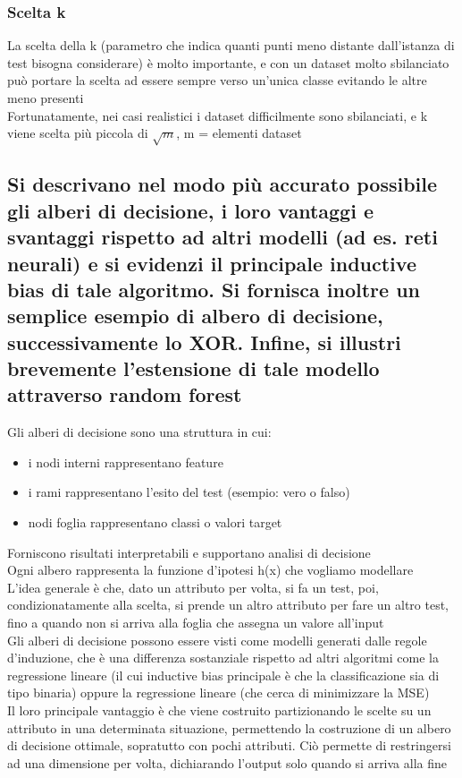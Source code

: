 \documentclass[10pt,oneside,a4paper]{article}
\begin{document}
	\subsubsection{Scelta k}
	La scelta della k (parametro che indica quanti punti meno distante dall'istanza di test bisogna considerare) è molto importante, e con un dataset molto sbilanciato può portare la scelta ad essere sempre verso un'unica classe evitando le altre meno presenti\\
	Fortunatamente, nei casi realistici i dataset difficilmente sono sbilanciati, e k viene scelta più piccola di $\sqrt{m}$, m = elementi dataset
	
	\subsection{Si descrivano nel modo più accurato possibile gli alberi di decisione, i loro vantaggi e svantaggi rispetto ad altri modelli (ad es. reti neurali)
		e si evidenzi il principale inductive bias di tale algoritmo. Si fornisca inoltre un semplice esempio di albero di decisione, successivamente lo XOR. Infine, si illustri brevemente l’estensione di tale modello attraverso random forest}
	Gli alberi di decisione sono una struttura in cui:
	\begin{itemize}
		\item i nodi interni rappresentano feature
		\item i rami rappresentano l'esito del test (esempio: vero o falso)
		\item nodi foglia rappresentano classi o valori target
	\end{itemize}
	Forniscono risultati interpretabili e supportano analisi di decisione\\
	Ogni albero rappresenta la funzione d'ipotesi h(x) che vogliamo modellare\\
	L'idea generale è che, dato un attributo per volta, si fa un test, poi, condizionatamente alla scelta, si prende un altro attributo per fare un altro test, fino a quando non si arriva alla foglia che assegna un valore all'input\\
	Gli alberi di decisione possono essere visti come modelli generati dalle regole d'induzione, che è una differenza sostanziale rispetto ad altri algoritmi come la regressione lineare (il cui inductive bias principale è che la classificazione sia di tipo binaria) oppure la regressione lineare (che cerca di minimizzare la MSE)\\
	Il loro principale vantaggio è che viene costruito partizionando le scelte su un attributo in una determinata situazione, permettendo la costruzione di un albero di decisione ottimale, sopratutto con pochi attributi. Ciò permette di restringersi ad una dimensione per volta, dichiarando l'output solo quando si arriva alla fine\\
\end{document}
